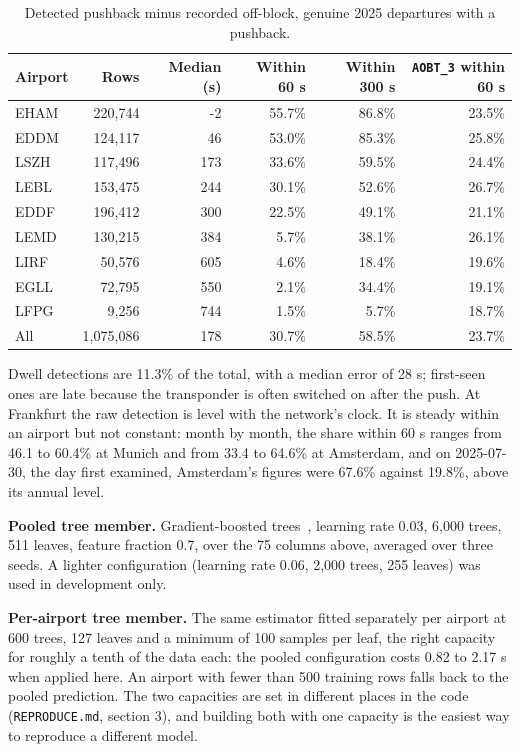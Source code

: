 \documentclass[
  manuscript=article,
  layout=preprint,
  year=2026,
  volume=x,
]{extra/joas}
\begin{document}
\begin{table}[htbp!]
  \centering
  \small
  \setlength{\tabcolsep}{5pt}\renewcommand{\arraystretch}{1.15}
  \caption{Detected pushback minus recorded off-block, genuine 2025 departures with a pushback.}
  \label{tab:17}
  \begin{tabular*}{\linewidth}{@{\extracolsep{\fill}}lrrrrr}
  \toprule
  \textbf{Airport} & \textbf{Rows} & \textbf{Median (s)} & \textbf{Within 60 s} & \textbf{Within 300 s} & \textbf{\texttt{AOBT\_3} within 60 s} \\
  \midrule
  EHAM & 220,744 & -2 & 55.7\% & 86.8\% & 23.5\% \\
  EDDM & 124,117 & 46 & 53.0\% & 85.3\% & 25.8\% \\
  LSZH & 117,496 & 173 & 33.6\% & 59.5\% & 24.4\% \\
  LEBL & 153,475 & 244 & 30.1\% & 52.6\% & 26.7\% \\
  EDDF & 196,412 & 300 & 22.5\% & 49.1\% & 21.1\% \\
  LEMD & 130,215 & 384 & 5.7\% & 38.1\% & 26.1\% \\
  LIRF & 50,576 & 605 & 4.6\% & 18.4\% & 19.6\% \\
  EGLL & 72,795 & 550 & 2.1\% & 34.4\% & 19.1\% \\
  LFPG & 9,256 & 744 & 1.5\% & 5.7\% & 18.7\% \\
  \midrule
  All & 1,075,086 & 178 & 30.7\% & 58.5\% & 23.7\% \\
  \bottomrule
  \end{tabular*}
\end{table}

Dwell detections are 11.3\% of the total, with a median error of 28 s; first-seen ones are late because the transponder is often switched on after the push. At Frankfurt the raw detection is level with the network's clock. It is steady within an airport but not constant: month by month, the share within 60 s ranges from 46.1 to 60.4\% at Munich and from 33.4 to 64.6\% at Amsterdam, and on 2025-07-30, the day first examined, Amsterdam's figures were 67.6\% against 19.8\%, above its annual level.

\textbf{Pooled tree member.} Gradient-boosted trees~\cite{ke2017lightgbm}, learning rate 0.03, 6,000 trees, 511 leaves, feature fraction 0.7, over the 75 columns above, averaged over three seeds. A lighter configuration (learning rate 0.06, 2,000 trees, 255 leaves) was used in development only.

\textbf{Per-airport tree member.} The same estimator fitted separately per airport at 600 trees, 127 leaves and a minimum of 100 samples per leaf, the right capacity for roughly a tenth of the data each: the pooled configuration costs 0.82 to 2.17 s when applied here. An airport with fewer than 500 training rows falls back to the pooled prediction. The two capacities are set in different places in the code (\texttt{REPRODUCE.md}, section 3), and building both with one capacity is the easiest way to reproduce a different model.
\end{document}
